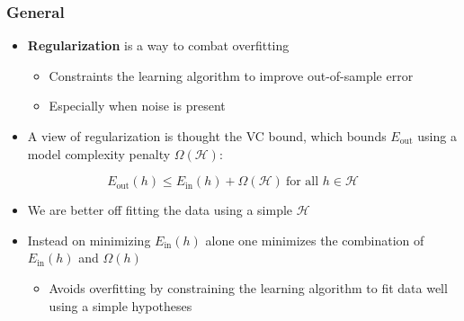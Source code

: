 \documentclass[11pt]{article}
\begin{document}
\subsubsection{General}
\label{sec:org61e80a7}
\begin{itemize}
\item \textbf{Regularization} is a way to combat overfitting
\begin{itemize}
\item Constraints the learning algorithm to improve out-of-sample error
\item Especially when noise is present
\end{itemize}

\item A view of regularization is thought the VC bound, which bounds \(E_\text{out}\) using a model complexity penalty \(\Omega(\mathcal H)\):
\end{itemize}
\begin{equation}
    E_\text{out}(h) \leq E_\text{in}(h) + \Omega(\mathcal H) \ \text{for all } h \in \mathcal H
\end{equation}
\begin{itemize}
\item We are better off fitting the data using a simple \(\mathcal H\)

\item Instead on minimizing \(E_\text{in}(h)\) alone one minimizes the combination of \(E_\text{in}(h)\) and \(\Omega(h)\)
\begin{itemize}
\item Avoids overfitting by constraining the learning algorithm to fit data well using a simple hypotheses
\end{itemize}
\end{itemize}
\end{document}
